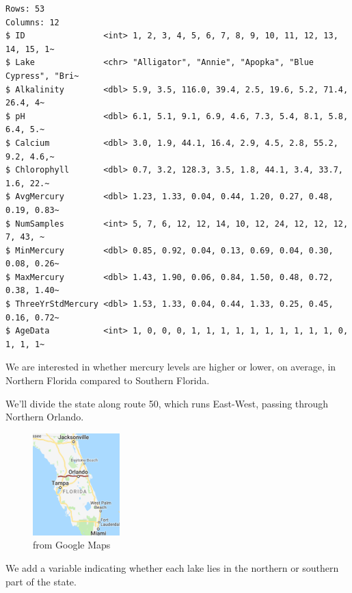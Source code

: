 \documentclass[
  letterpaper,
  DIV=11,
  numbers=noendperiod]{scrreprt}
\begin{document}
\begin{verbatim}
Rows: 53
Columns: 12
$ ID                <int> 1, 2, 3, 4, 5, 6, 7, 8, 9, 10, 11, 12, 13, 14, 15, 1~
$ Lake              <chr> "Alligator", "Annie", "Apopka", "Blue Cypress", "Bri~
$ Alkalinity        <dbl> 5.9, 3.5, 116.0, 39.4, 2.5, 19.6, 5.2, 71.4, 26.4, 4~
$ pH                <dbl> 6.1, 5.1, 9.1, 6.9, 4.6, 7.3, 5.4, 8.1, 5.8, 6.4, 5.~
$ Calcium           <dbl> 3.0, 1.9, 44.1, 16.4, 2.9, 4.5, 2.8, 55.2, 9.2, 4.6,~
$ Chlorophyll       <dbl> 0.7, 3.2, 128.3, 3.5, 1.8, 44.1, 3.4, 33.7, 1.6, 22.~
$ AvgMercury        <dbl> 1.23, 1.33, 0.04, 0.44, 1.20, 0.27, 0.48, 0.19, 0.83~
$ NumSamples        <int> 5, 7, 6, 12, 12, 14, 10, 12, 24, 12, 12, 12, 7, 43, ~
$ MinMercury        <dbl> 0.85, 0.92, 0.04, 0.13, 0.69, 0.04, 0.30, 0.08, 0.26~
$ MaxMercury        <dbl> 1.43, 1.90, 0.06, 0.84, 1.50, 0.48, 0.72, 0.38, 1.40~
$ ThreeYrStdMercury <dbl> 1.53, 1.33, 0.04, 0.44, 1.33, 0.25, 0.45, 0.16, 0.72~
$ AgeData           <int> 1, 0, 0, 0, 1, 1, 1, 1, 1, 1, 1, 1, 1, 1, 0, 1, 1, 1~
\end{verbatim}

We are interested in whether mercury levels are higher or lower, on
average, in Northern Florida compared to Southern Florida.

We'll divide the state along route 50, which runs East-West, passing
through Northern Orlando.

\begin{figure}[H]

{\centering \includegraphics[width=0.3\textwidth,height=\textheight]{Florida.png}

}

\caption{from Google Maps}

\end{figure}%

We add a variable indicating whether each lake lies in the northern or
southern part of the state.
\end{document}
